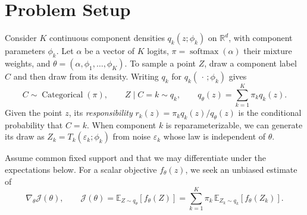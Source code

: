 \section{Problem Setup}
Consider $K$ continuous component densities $q_k(z;\phi_k)$ on
$\mathbb R^d$, with component parameters $\phi_k$. Let $\alpha$ be a vector
of $K$ logits, $\pi=\operatorname{softmax}(\alpha)$ their mixture weights,
and $\theta=(\alpha,\phi_1,\ldots,\phi_K)$. To sample a point $Z$, draw a
component label $C$ and then draw from its density. Writing $q_k$ for
$q_k(\,\cdot\,;\phi_k)$ gives
\begin{equation}
 C\sim\operatorname{Categorical}(\pi),\qquad
 Z\mid C=k\sim q_k,\qquad
 q_\theta(z)=\sum_{k=1}^K\pi_k q_k(z).
 \label{eq:mixture}
\end{equation}
Given the point $z$, its \emph{responsibility}
$r_k(z)=\pi_k q_k(z)/q_\theta(z)$ is the conditional probability that $C=k$.
When component $k$ is reparameterizable, we can generate its draw as
$Z_k=T_k(\varepsilon_k;\phi_k)$ from noise $\varepsilon_k$ whose law is
independent of $\theta$.

Assume common fixed support and that we may differentiate under the
expectations below. For a scalar objective $f_\theta(z)$, we seek an unbiased
estimate of
\begin{equation}
 \nabla_\theta \mathcal J(\theta),\qquad
 \mathcal J(\theta)=\mathbb E_{Z\sim q_\theta}[f_\theta(Z)]
       =\sum_{k=1}^K\pi_k\,\mathbb E_{Z_k\sim q_k}[f_\theta(Z_k)].
 \label{eq:objective}
\end{equation}
